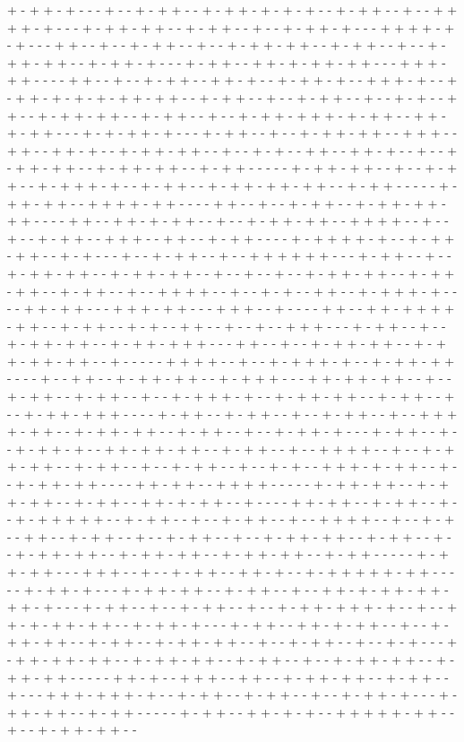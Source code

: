 + - + + - + - - - + - - + - + + - - + - + + - + - + - + - - + - + + - - + - - + + + + - + - - - + - + + - + + - - + - + + - - + - - + - + + - + - - - + + + + - + - + - - - + + - - + - - + - + + - - + - - + - + + - + + - - + - + + - - + - - + - + + - + + - - + - + + - + - - - + - + + - - + + - + - + + - + + - - - + + + - + + - - - - + + - - + - - + - + + - - + + - + - - + - + + - + - - + + + - + - - + - + + - + - + - + - + + - + + - - + - + + - - + - - + - + + - - + - - + - + - - + + - - + - + + - + + - - + - + + - - + - - + - + + - + + + - + - + + - - + + - + - + + - - - + - + - + + - + - - - + - + + - - + - - + - + + - + + - - + + + - - + + - - + + - + - - + - + + - + + - - + - - + - + - - + + - - + + - + - - + - - + - + + - + + - - + - + + - + + - - + - + + - - - - - + - + + - + + - - + - - + - + + - - + - + + + - + - - + - + + - - + - + + - + + - + + - - + - + + - - - - - + - + + - + + - - + + + + - + + - - - - + + - - + - - + - + + - - + - + + - + + - + + - - - - + + - - + + - + - + + - - + - - + - + + - + + - - + + + + - - + - - + - - + - + + - - + + + - - + + - - + - + + - - - - + - + + + + - + - - + - + + - + + - - + - + - - - + - - + - + + - - + - - + + + + + + - - - + - + + - - + - - + - + + - + + - - + - + + - + + - - + - - + - - + - - + - + + - + + - - + - + + - + + - - + - + + - - + - - + + + + - - + - - + - + - - + + - - + - + + + - + - - - - + + - + + - - - + + + - + + - - - + + + - - + - - - - + + - - + + - + + + + - + + - - + - + + - - + - + - - + + - - + - - + - - + + + - - - + - + + - - + - - + - + + - + + - - + - + + - + + + - - - + + - - + - - + - + + - + + - - + - + + - + + - + + - - + - - - - - + + + + - - + - - + - + + + - + - - + - + + - + + - - - - + - - + + - - + - + + - + + - - + - + + + - - - + + - + + - + + - - + - - + - + + - - + - + + - - + - - + - + + + - + - - + - + + - + + - - + - + + - - + - - + - + + - + + + - - - - + - + + - - + - + + - - + - - + - + + - - + - - + + + + - + + - - + - + + - + + - - + - + + - - + - - + - + + - + - - - + - + + - - + - - + - + + - + - - + + - + + - + + - - + - + + - - + - - + + + + - - + - - + - + + - + + - - + - + + - - + - - + - + + - - + - - + - + - - + + + - + - + + - - + - - + - + + - + + - - - - + + - + + - - + + + + - - - - - + - + + - + + - - + - + + - + + - - + - + + - - + + - + - + + - - + - - - - + + - + + - - + - + + - - + - - + - + + + + + - - + - + + - - + - - + - + + - - + - - + + + + - - + - - + - + - - + + - - + - + + - - + - - + - + + - - + - - + - + + - + + - - + - + + - - + - - + - + + - + + - - + - + + - + + - - + - + + - + + - - + - + + - - - - - + - + + - + + - - - + + + - - + - - + - + + - - + + - + - - + - + + + + + - + + - - - - - + - + + - + - - - + - + + - + + - - + - + + - - + - - + + - + - + + - + + - + + - + - - - + - + + - - + - - + - + + - - + - - + - + + - + + + - + - - + - - + + - + - + + - + + - - + - + + - + - - - + - + + - - + + - + - + + - - + - - + - + + - + + - - + - + + - - + - + + - + + - - + - - + - + + - - + - - + - + - - - + - + + - + + - + + - - + - + + - + + - - + - + + - - + - - + - + + - + + - - + - + + - + + - - - - - + + - + - - + + + - - + + - - + - + + - + + - - + - + + - - + - - - + + + - + + + - + - - + - + + - - + - + + - - + - - + - + + - + - - - + - + + - + + - - + - + + - - - - - + - + + - - + + - + - + - - + + + + + - + + - - + - - + - + + - + + - - 
